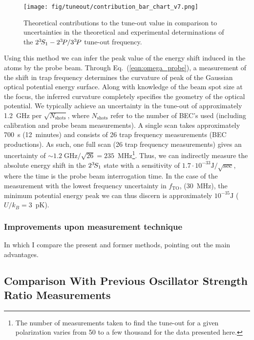 	\begin{figure}[t]
	    \centering
	    \texttt{[image: fig/tuneout/contribution\_bar\_chart\_v7.png]}
	    \caption{Theoretical contributions to the tune-out value in comparison to uncertainties in the theoretical and experimental determinations of the \(2^{3\!}S_1- 2^{3\!}P / 3^{3\!}P\) tune-out frequency.}
	    \label{fig:contributions}
	\end{figure}


	
	Using this method we can infer the peak value of the energy shift induced in the atoms by the probe beam. 
	Through Eq.~(\ref{eqn:omega_probe}), a measurement of the shift in trap frequency determines the curvature of peak of the Gaussian optical potential energy surface. 
	Along with knowledge of the beam spot size at the focus, the inferred curvature completely specifies the geometry of the optical potential. 
	We typically achieve an uncertainty in the tune-out of approximately 1.2~$\text{GHz}$ per $\sqrt{N_\text{shots}}$, where \(N_\text{shots}\) refer to the number of BEC's used (including calibration and probe beam measurements). 
	A single scan takes approximately 700~s (12~minutes) and consists of 26 trap frequency measurements (BEC productions). 
	As such, one full scan (26 trap frequency measurements) gives an uncertainty of $\sim 1.2\;\mathrm{GHz}/\sqrt{26}=235$~MHz\footnote{The number of measurements taken to find the tune-out for a given polarization varies from 50 to a few thousand for the data presented here.}.
	Thus, we can indirectly measure the absolute energy shift in the $2^{3\!}S_1$ state with a sensitivity of $1.7\cdot10^{-33}\mathrm{J}/\sqrt{\mathrm{sec}}$, where the time is the probe beam interrogation time. 
	In the case of the measurement with the lowest frequency uncertainty in $f_\textrm{TO}$, (30~MHz), the minimum potential energy peak we can thus discern is approximately $10^{-35}\mathrm{J}$ ($U/k_B=3$~pK).

\subsubsection{Improvements upon measurement technique}

	In which I compare the present and former methods, pointing out the main advantages.

\subsection{Comparison With Previous Oscillator Strength Ratio Measurements}
	
